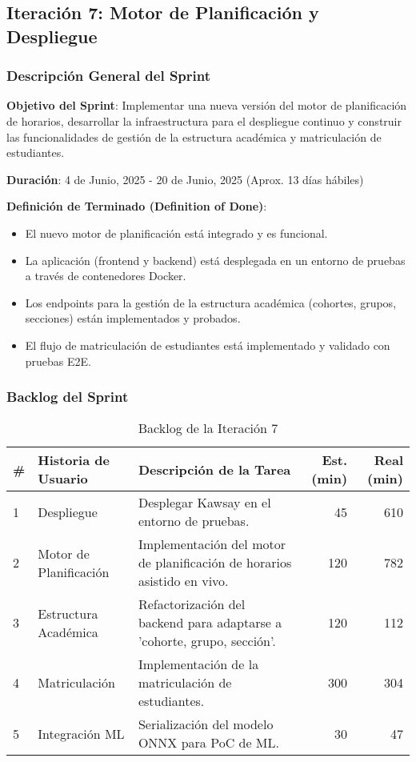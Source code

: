 \subsection{Iteración 7: Motor de Planificación y Despliegue}

\subsubsection{Descripción General del Sprint}

\textbf{Objetivo del Sprint}: Implementar una nueva versión del motor de planificación de horarios, desarrollar la infraestructura para el despliegue continuo y construir las funcionalidades de gestión de la estructura académica y matriculación de estudiantes.

\textbf{Duración}: 4 de Junio, 2025 - 20 de Junio, 2025 (Aprox. 13 días hábiles)

\textbf{Definición de Terminado (Definition of Done)}: 
\begin{itemize}
    \item El nuevo motor de planificación está integrado y es funcional.
    \item La aplicación (frontend y backend) está desplegada en un entorno de pruebas a través de contenedores Docker.
    \item Los endpoints para la gestión de la estructura académica (cohortes, grupos, secciones) están implementados y probados.
    \item El flujo de matriculación de estudiantes está implementado y validado con pruebas E2E.
\end{itemize}

\subsubsection{Backlog del Sprint}

\begin{table}[H]
\caption{Backlog de la Iteración 7}
\label{tab:iteration-7-backlog}
\begin{tabularx}{\textwidth}{@{}llXrr@{}}
\toprule
\textbf{\#} & \textbf{Historia de Usuario} & \textbf{Descripción de la Tarea} & \textbf{Est. (min)} & \textbf{Real (min)} \\
\midrule
    1 & Despliegue & Desplegar Kawsay en el entorno de pruebas. & 45 & 610 \\
    2 & Motor de Planificación & Implementación del motor de planificación de horarios asistido en vivo. & 120 & 782 \\
    3 & Estructura Académica & Refactorización del backend para adaptarse a 'cohorte, grupo, sección'. & 120 & 112 \\
    4 & Matriculación & Implementación de la matriculación de estudiantes. & 300 & 304 \\
    5 & Integración ML & Serialización del modelo ONNX para PoC de ML. & 30 & 47 \\
\bottomrule
\end{tabularx}
\end{table}

